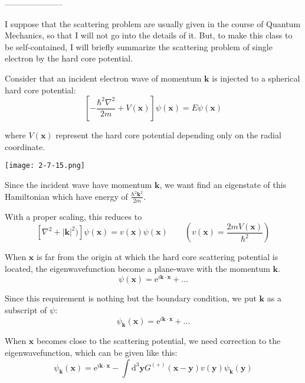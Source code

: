 \begin{center}---------------------\end{center}

I suppose that the scattering problem are usually given in the course of Quantum Mechanics, so that I will not go into the details of it. But, to make this class to be self-contained, I will briefly summarize the scattering problem of single electron by the hard core potential.

Consider that an incident electron wave of momentum $\mathbf{k}$ is injected to a spherical hard core potential:
\begin{equation*} \label{Eqs2.7.A.1} \tag{2.7.A.1}
\left[ -\frac{\hbar^2\nabla^2}{2m}+ V(\mathbf{x}) \right] \psi(\mathbf{x}) = E \psi(\mathbf{x})
\end{equation*}

where $V(\mathbf{x})$ represent the hard core potential depending only on the radial coordinate.
\begin{center} \texttt{[image: 2-7-15.png]} \label{Fig2.7.15} \end{center}

Since the incident wave have momentum $\mathbf{k}$, we want find an eigenstate of this Hamiltonian which have energy of $\frac{\hbar^2\mathbf{k}^2}{2m}$.

With a proper scaling, this reduces to
\begin{equation*} \label{Eqs2.7.A.1'} \tag{2.7.A.1'}
\left[ \nabla^2+ |\mathbf{k}|^2) \right] \psi(\mathbf{x}) = v(\mathbf{x}) \psi(\mathbf{x}) \qquad \left(v(\mathbf{x})=\frac{2mV(\mathbf{x})}{\hbar^2}\right)
\end{equation*}

When $\mathbf{x}$ is far from the origin at which the hard core scattering potential is located, the eigenwavefunction become a plane-wave with the momentum $\mathbf{k}$.
\[ \psi(\mathbf{x}) = \mathrm{e}^{i \mathbf{k}\cdot \mathbf{x}} + \ldots \]

Since this requirement is nothing but the boundary condition, we put $\mathbf{k}$ as a subscript of $\psi$:
\[ \psi_\mathbf{k}(\mathbf{x}) = \mathrm{e}^{i \mathbf{k}\cdot \mathbf{x}} + \ldots \]

When $\mathbf{x}$ becomes close to the scattering potential, we need correction to the eigenwavefunction, which can be given like this:
\begin{equation*} \label{Eqs2.7.A.2} \tag{2.7.A.2} \psi_\mathbf{k}(\mathbf{x}) = \mathrm{e}^{i \mathbf{k}\cdot \mathbf{x}} - \int \mathrm{d}^3 \mathbf{y} G^{(+)}(\mathbf{x}-\mathbf{y}) v(\mathbf{y}) \psi_{\mathbf{k}}(\mathbf{y})
\end{equation*}

